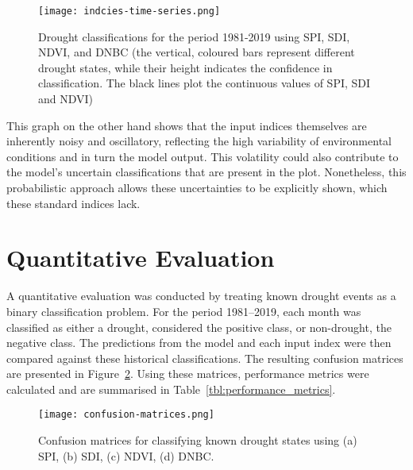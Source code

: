 \begin{figure}[!h]
    \centering
    \texttt{[image: indcies-time-series.png]}
    \caption[Indices \& Model Output Time Series]{Drought classifications for the period 1981-2019 using SPI, SDI, NDVI, and DNBC (the vertical, coloured bars represent different drought states, while their height indicates the confidence in classification. The black lines plot the continuous values of SPI, SDI and NDVI)}
    \label{fig:model-input-output}
\end{figure}

This graph on the other hand shows that the input indices themselves are inherently noisy and oscillatory, reflecting the high variability of environmental conditions and in turn the model output. This volatility could also contribute to the model's uncertain classifications that are present in the plot. Nonetheless, this probabilistic approach allows these uncertainties to be explicitly shown, which these standard indices lack.

\section{Quantitative Evaluation}

A quantitative evaluation was conducted by treating known drought events as a binary classification problem. For the period 1981–2019, each month was classified as either a drought, considered the positive class, or non-drought, the negative class. The predictions from the model and each input index were then compared against these historical classifications. The resulting confusion matrices are presented in Figure~\ref{fig:confusion-matrices}. Using these matrices, performance metrics were calculated and are summarised in Table~\ref{tbl:performance_metrics}.

\begin{figure}[!h]
    \centering
    \texttt{[image: confusion-matrices.png]}
    \caption[Confusion Matrices For Drought Classifications of Input Indices \& DNBC]{Confusion matrices for classifying known drought states using (a) SPI, (b) SDI, (c) NDVI, (d) DNBC.}
    \label{fig:confusion-matrices}
\end{figure}

